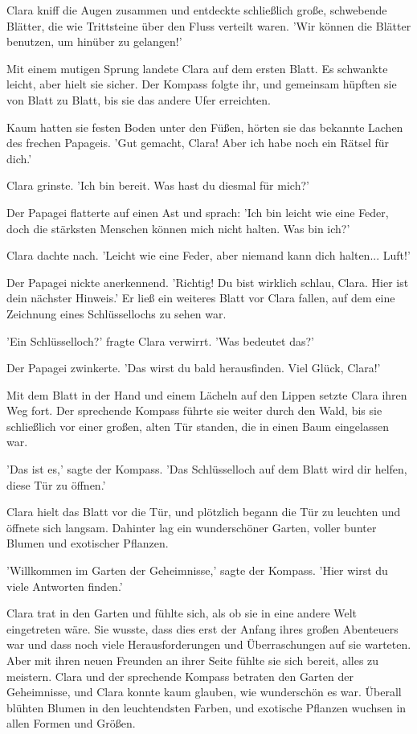 \documentclass[12pt]{article}
\begin{document}
Clara kniff die Augen zusammen und entdeckte schließlich große, schwebende Blätter, die wie Trittsteine über den Fluss verteilt waren. 'Wir können die Blätter benutzen, um hinüber zu gelangen!'

Mit einem mutigen Sprung landete Clara auf dem ersten Blatt. Es schwankte leicht, aber hielt sie sicher. Der Kompass folgte ihr, und gemeinsam hüpften sie von Blatt zu Blatt, bis sie das andere Ufer erreichten.

Kaum hatten sie festen Boden unter den Füßen, hörten sie das bekannte Lachen des frechen Papageis. 'Gut gemacht, Clara! Aber ich habe noch ein Rätsel für dich.'

Clara grinste. 'Ich bin bereit. Was hast du diesmal für mich?'

Der Papagei flatterte auf einen Ast und sprach: 'Ich bin leicht wie eine Feder, doch die stärksten Menschen können mich nicht halten. Was bin ich?'

Clara dachte nach. 'Leicht wie eine Feder, aber niemand kann dich halten... Luft!'

Der Papagei nickte anerkennend. 'Richtig! Du bist wirklich schlau, Clara. Hier ist dein nächster Hinweis.' Er ließ ein weiteres Blatt vor Clara fallen, auf dem eine Zeichnung eines Schlüssellochs zu sehen war.

'Ein Schlüsselloch?' fragte Clara verwirrt. 'Was bedeutet das?'

Der Papagei zwinkerte. 'Das wirst du bald herausfinden. Viel Glück, Clara!'

Mit dem Blatt in der Hand und einem Lächeln auf den Lippen setzte Clara ihren Weg fort. Der sprechende Kompass führte sie weiter durch den Wald, bis sie schließlich vor einer großen, alten Tür standen, die in einen Baum eingelassen war.

'Das ist es,' sagte der Kompass. 'Das Schlüsselloch auf dem Blatt wird dir helfen, diese Tür zu öffnen.'

Clara hielt das Blatt vor die Tür, und plötzlich begann die Tür zu leuchten und öffnete sich langsam. Dahinter lag ein wunderschöner Garten, voller bunter Blumen und exotischer Pflanzen.

'Willkommen im Garten der Geheimnisse,' sagte der Kompass. 'Hier wirst du viele Antworten finden.'

Clara trat in den Garten und fühlte sich, als ob sie in eine andere Welt eingetreten wäre. Sie wusste, dass dies erst der Anfang ihres großen Abenteuers war und dass noch viele Herausforderungen und Überraschungen auf sie warteten. Aber mit ihren neuen Freunden an ihrer Seite fühlte sie sich bereit, alles zu meistern. Clara und der sprechende Kompass betraten den Garten der Geheimnisse, und Clara konnte kaum glauben, wie wunderschön es war. Überall blühten Blumen in den leuchtendsten Farben, und exotische Pflanzen wuchsen in allen Formen und Größen. 
\end{document}
